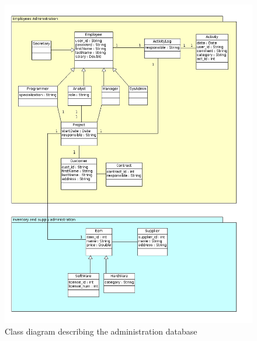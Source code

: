 \begin{figure}[!h]
\centering
\includegraphics[scale=0.50]{assign3/argo/imgs/administrative.png}
\caption{Class diagram describing the administration database}
\label{3img:classadmin}
\end{figure}

